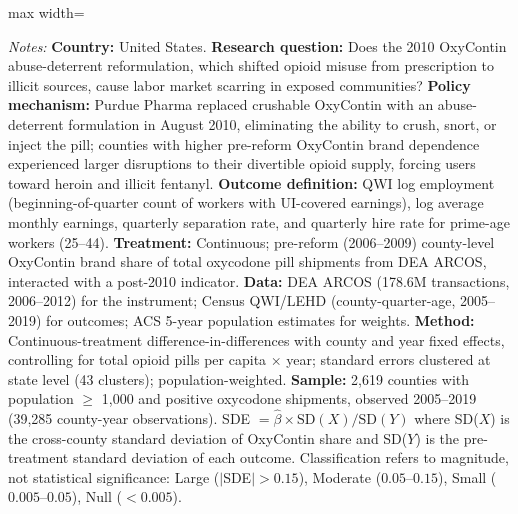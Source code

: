 \begin{table}[t]
\begin{adjustbox}{max width=\textwidth}
\begin{threeparttable}
\begin{tablenotes}[flushleft]
\item \textit{Notes:} \textbf{Country:} United States. \textbf{Research question:} Does the 2010 OxyContin abuse-deterrent reformulation, which shifted opioid misuse from prescription to illicit sources, cause labor market scarring in exposed communities? \textbf{Policy mechanism:} Purdue Pharma replaced crushable OxyContin with an abuse-deterrent formulation in August 2010, eliminating the ability to crush, snort, or inject the pill; counties with higher pre-reform OxyContin brand dependence experienced larger disruptions to their divertible opioid supply, forcing users toward heroin and illicit fentanyl. \textbf{Outcome definition:} QWI log employment (beginning-of-quarter count of workers with UI-covered earnings), log average monthly earnings, quarterly separation rate, and quarterly hire rate for prime-age workers (25--44). \textbf{Treatment:} Continuous; pre-reform (2006--2009) county-level OxyContin brand share of total oxycodone pill shipments from DEA ARCOS, interacted with a post-2010 indicator. \textbf{Data:} DEA ARCOS (178.6M transactions, 2006--2012) for the instrument; Census QWI/LEHD (county-quarter-age, 2005--2019) for outcomes; ACS 5-year population estimates for weights. \textbf{Method:} Continuous-treatment difference-in-differences with county and year fixed effects, controlling for total opioid pills per capita $\times$ year; standard errors clustered at state level (43 clusters); population-weighted. \textbf{Sample:} 2,619 counties with population $\geq$ 1,000 and positive oxycodone shipments, observed 2005--2019 (39,285 county-year observations). SDE $= \hat{\beta} \times \text{SD}(X) / \text{SD}(Y)$ where SD($X$) is the cross-county standard deviation of OxyContin share and SD($Y$) is the pre-treatment standard deviation of each outcome. Classification refers to magnitude, not statistical significance: Large ($|$SDE$| > 0.15$), Moderate ($0.05$--$0.15$), Small ($0.005$--$0.05$), Null ($< 0.005$).
\end{tablenotes}
\end{threeparttable}
\end{adjustbox}
\end{table}

